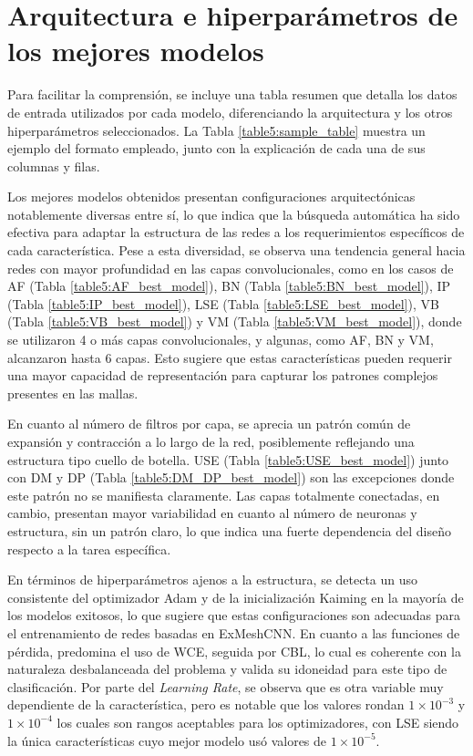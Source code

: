\appendix
\chapter{Arquitectura e hiperparámetros de los mejores modelos}
\label{best_model_arch}
Para facilitar la comprensión, se incluye una tabla resumen que detalla los datos de entrada utilizados por cada modelo, diferenciando la arquitectura y los otros hiperparámetros seleccionados. La Tabla \ref{table5:sample_table} muestra un ejemplo del formato empleado, junto con la explicación de cada una de sus columnas y filas.

Los mejores modelos obtenidos presentan configuraciones arquitectónicas notablemente diversas entre sí, lo que indica que la búsqueda automática ha sido efectiva para adaptar la estructura de las redes a los requerimientos específicos de cada característica. Pese a esta diversidad, se observa una tendencia general hacia redes con mayor profundidad en las capas convolucionales, como en los casos de AF (Tabla \ref{table5:AF_best_model}), BN (Tabla \ref{table5:BN_best_model}), IP (Tabla \ref{table5:IP_best_model}), LSE (Tabla \ref{table5:LSE_best_model}), VB (Tabla \ref{table5:VB_best_model}) y VM (Tabla \ref{table5:VM_best_model}), donde se utilizaron 4 o más capas convolucionales, y algunas, como AF, BN y VM, alcanzaron hasta 6 capas. Esto sugiere que estas características pueden requerir una mayor capacidad de representación para capturar los patrones complejos presentes en las mallas.

En cuanto al número de filtros por capa, se aprecia un patrón común de expansión y contracción a lo largo de la red, posiblemente reflejando una estructura tipo cuello de botella. USE (Tabla \ref{table5:USE_best_model}) junto con DM y DP (Tabla \ref{table5:DM_DP_best_model}) son las excepciones donde este patrón no se manifiesta claramente. Las capas totalmente conectadas, en cambio, presentan mayor variabilidad en cuanto al número de neuronas y estructura, sin un patrón claro, lo que indica una fuerte dependencia del diseño respecto a la tarea específica.

En términos de hiperparámetros ajenos a la estructura, se detecta un uso consistente del optimizador Adam y de la inicialización Kaiming en la mayoría de los modelos exitosos, lo que sugiere que estas configuraciones son adecuadas para el entrenamiento de redes basadas en ExMeshCNN. En cuanto a las funciones de pérdida, predomina el uso de WCE, seguida por CBL, lo cual es coherente con la naturaleza desbalanceada del problema y valida su idoneidad para este tipo de clasificación. Por parte del \textit{Learning Rate}, se observa que es otra variable muy dependiente de la característica, pero es notable que los valores rondan $1\times10^{-3}$ y $1\times10^{-4}$ los cuales son rangos aceptables para los optimizadores, con LSE siendo la única características cuyo mejor modelo usó valores de $1\times10^{-5}$. 

